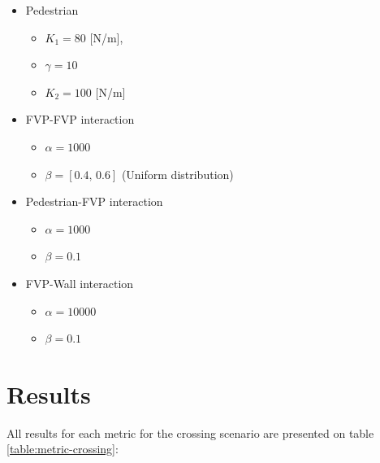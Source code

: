\documentclass[english]{article}
\begin{document}
        \begin{itemize}
            \item Pedestrian 
            
            \begin{itemize}
                \item $K_{1}=80$ {[}N/m{]}, 
                \item $\gamma=10$ 
                \item $K_{2}=100$ {[}N/m{]} 
            \end{itemize}
            \item FVP-FVP interaction 
            
            \begin{itemize}
                \item $\alpha=1000$ 
                \item $\beta=[0.4,\,0.6]$ (Uniform distribution) 
                \end{itemize}
            \item Pedestrian-FVP interaction 
            
            \begin{itemize}
                \item $\alpha=1000$ 
                \item $\beta=0.1$ 
            \end{itemize}
            \item FVP-Wall interaction 
            
            \begin{itemize}
                \item $\alpha=10000$ 
                \item $\beta=0.1$ 
            \end{itemize}
        \end{itemize}

\section{Results}
    
    All results for each metric for the crossing scenario are presented on table \ref{table:metric-crossing}:
    
\end{document}
